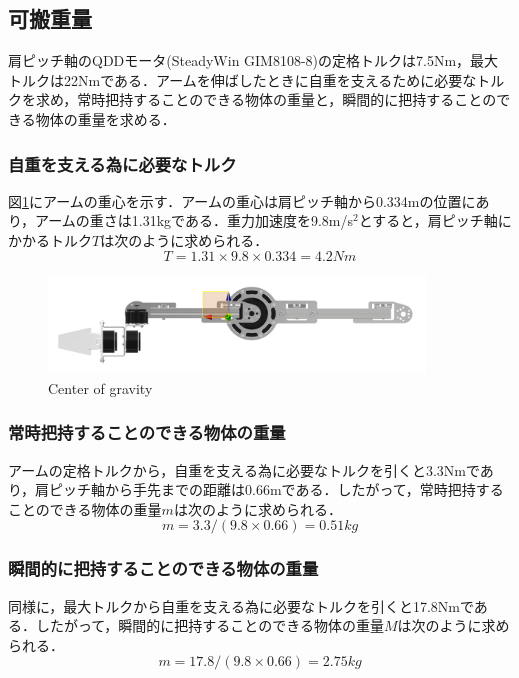 \subsection{可搬重量}
肩ピッチ軸のQDDモータ(SteadyWin GIM8108-8)の定格トルクは7.5Nm，最大トルクは22Nmである．アームを伸ばしたときに自重を支えるために必要なトルクを求め，常時把持することのできる物体の重量と，瞬間的に把持することのできる物体の重量を求める．
\subsubsection{自重を支える為に必要なトルク}
図\ref{fig:CoG}にアームの重心を示す．アームの重心は肩ピッチ軸から0.334mの位置にあり，アームの重さは1.31kgである．重力加速度を9.8m/s$^2$とすると，肩ピッチ軸にかかるトルク$T$は次のように求められる．
\begin{equation}
  T = 1.31 \times 9.8 \times 0.334 = 4.2 Nm
\end{equation}
\begin{figure}[h]
  \centering
  \includegraphics[width=10cm]{images/design/CoG.png}
  \caption{Center of gravity}
  \label{fig:CoG}
\end{figure}

\subsubsection{常時把持することのできる物体の重量}
アームの定格トルクから，自重を支える為に必要なトルクを引くと3.3Nmであり，肩ピッチ軸から手先までの距離は0.66mである．したがって，常時把持することのできる物体の重量$m$は次のように求められる．
\begin{equation}
  m = 3.3 / (9.8 \times 0.66) = 0.51kg
\end{equation}

\subsubsection{瞬間的に把持することのできる物体の重量}
同様に，最大トルクから自重を支える為に必要なトルクを引くと17.8Nmである．したがって，瞬間的に把持することのできる物体の重量$M$は次のように求められる．
\begin{equation}
  m = 17.8 / (9.8 \times 0.66) = 2.75kg
\end{equation}


\clearpage
\newpage